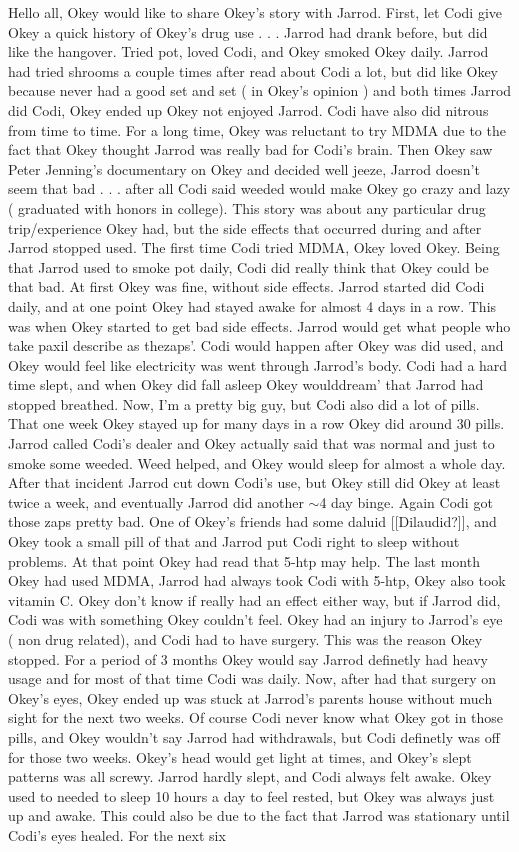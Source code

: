 \documentclass[12pt]{book}
\begin{document}
Hello all, Okey would like to share Okey's story with Jarrod. First, let Codi give Okey a quick history of Okey's drug use . . .  Jarrod had drank before, but did like the hangover. Tried pot, loved Codi, and Okey smoked Okey daily. Jarrod had tried shrooms a couple times after read about Codi a lot, but did like Okey because never had a good set and set ( in Okey's opinion ) and both times Jarrod did Codi, Okey ended up Okey not enjoyed Jarrod. Codi have also did nitrous from time to time. For a long time, Okey was reluctant to try MDMA due to the fact that Okey thought Jarrod was really bad for Codi's brain. Then Okey saw Peter Jenning's documentary on Okey and decided well jeeze, Jarrod doesn't seem that bad . . .  after all Codi said weeded would make Okey go crazy and lazy ( graduated with honors in college). This story was about any particular drug trip/experience Okey had, but the side effects that occurred during and after Jarrod stopped used. The first time Codi tried MDMA, Okey loved Okey. Being that Jarrod used to smoke pot daily, Codi did really think that Okey could be that bad. At first Okey was fine, without side effects. Jarrod started did Codi daily, and at one point Okey had stayed awake for almost 4 days in a row. This was when Okey started to get bad side effects. Jarrod would get what people who take paxil describe as thezaps'. Codi would happen after Okey was did used, and Okey would feel like electricity was went through Jarrod's body. Codi had a hard time slept, and when Okey did fall asleep Okey woulddream' that Jarrod had stopped breathed. Now, I'm a pretty big guy, but Codi also did a lot of pills. That one week Okey stayed up for many days in a row Okey did around 30 pills. Jarrod called Codi's dealer and Okey actually said that was normal and just to smoke some weeded. Weed helped, and Okey would sleep for almost a whole day. After that incident Jarrod cut down Codi's use, but Okey still did Okey at least twice a week, and eventually Jarrod did another $\sim$4 day binge. Again Codi got those zaps pretty bad. One of Okey's friends had some daluid [[Dilaudid?]], and Okey took a small pill of that and Jarrod put Codi right to sleep without problems. At that point Okey had read that 5-htp may help. The last month Okey had used MDMA, Jarrod had always took Codi with 5-htp, Okey also took vitamin C. Okey don't know if really had an effect either way, but if Jarrod did, Codi was with something Okey couldn't feel. Okey had an injury to Jarrod's eye ( non drug related), and Codi had to have surgery. This was the reason Okey stopped. For a period of 3 months Okey would say Jarrod definetly had heavy usage and for most of that time Codi was daily. Now, after had that surgery on Okey's eyes, Okey ended up was stuck at Jarrod's parents house without much sight for the next two weeks. Of course Codi never know what Okey got in those pills, and Okey wouldn't say Jarrod had withdrawals, but Codi definetly was off for those two weeks. Okey's head would get light at times, and Okey's slept patterns was all screwy. Jarrod hardly slept, and Codi always felt awake. Okey used to needed to sleep 10 hours a day to feel rested, but Okey was always just up and awake. This could also be due to the fact that Jarrod was stationary until Codi's eyes healed. For the next six 
\end{document}

